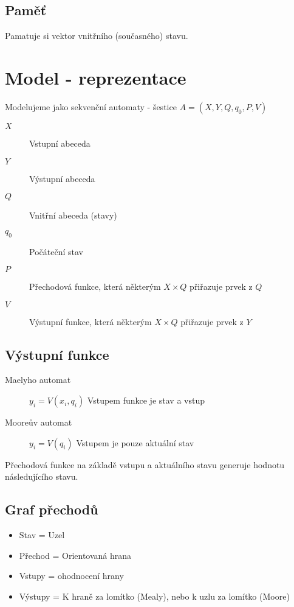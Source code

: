 \documentclass[a4wide]{report}
\begin{document}
\subsection{Paměť}
Pamatuje si vektor vnitřního (současného) stavu.

\section{Model - reprezentace}

Modelujeme jako sekvenční automaty - šestice $A = (X, Y, Q, q_0, P, V)$
\begin{description}
	\item[$X$] Vstupní abeceda
	\item[$Y$] Výstupní abeceda
	\item[$Q$] Vnitřní abeceda (stavy)
	\item[$q_0$] Počáteční stav
	\item[$P$] Přechodová funkce, která některým $X \times Q$ přiřazuje prvek z $Q$
	\item[$V$] Výstupní funkce, která některým $X \times Q$ přiřazuje prvek z $Y$
\end{description}

\subsection{Výstupní funkce}
\begin{description}
	\item[Maelyho automat] $y_i = V(x_i, q_i)$ Vstupem funkce je stav a vstup
	\item[Mooreův automat] $y_i = V(q_i)$ Vstupem je pouze aktuální stav
\end{description}

Přechodová funkce na základě vstupu a aktuálního stavu generuje hodnotu následujícího stavu.

\subsection{Graf přechodů}

\begin{itemize}
	\item Stav = Uzel
	\item Přechod = Orientovaná hrana
	\item Vstupy = ohodnocení hrany
	\item Výstupy = K hraně za lomítko (Mealy), nebo k uzlu za lomítko (Moore)
\end{itemize}
\end{document}
